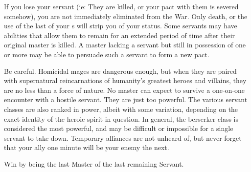 \documentclass[blue]{FateDarkDawn}
\begin{document}
If you lose your servant (ie: They are killed, or your pact with them is severed somehow), you are not immediately eliminated from the War. Only death, or the use of the last of your \iCommand{\MYname}s will strip you of your status. Some servants may have abilities that allow them to remain for an extended period of time after their original master is killed. A master lacking a servant but still in possession of one or more \iCommand{\MYname} may be able to persuade such a servant to form a new pact.

Be careful. Homicidal mages are dangerous enough, but when they are paired with supernatural reincarnations of humanity's greatest heroes and villains, they are no less than a force of nature. No master can expect to survive a one-on-one encounter with a hostile servant. They are just too powerful. The various servant classes are also ranked in power, albeit with some variation, depending on the exact identity of the heroic spirit in question. In general, the berserker class is considered the most powerful, and may be difficult or impossible for a single servant to take down. Temporary alliances are not unheard of, but never forget that your ally one minute will be your enemy the next.

\begin{itemz}[Goals]
	\item Win \iGrail{} by being the last Master of the last remaining Servant.
\end{itemz}
\end{document}

